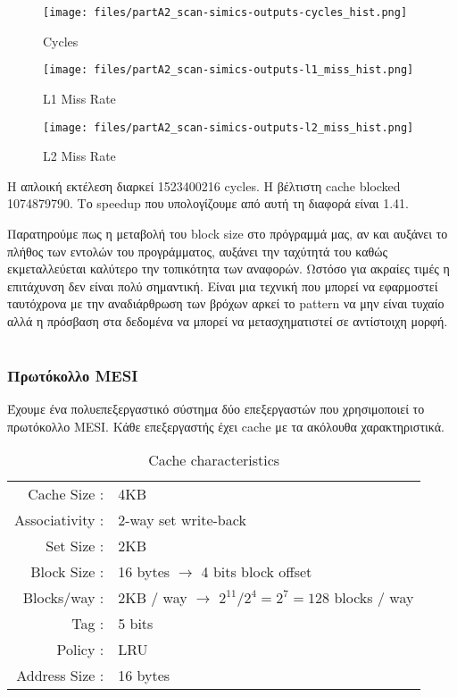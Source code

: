 \documentclass[a4paper,12pt]{article}
\begin{document}
\begin{figure}[H]
	\centering
    \texttt{[image: files/partA2\_scan-simics-outputs-cycles\_hist.png]}
	\caption{Cycles}
	\label{fig:B1}
\end{figure}

\begin{figure}[H]
	\centering
    \texttt{[image: files/partA2\_scan-simics-outputs-l1\_miss\_hist.png]}
    \caption{L1 Miss Rate}
	\label{fig:B2}
\end{figure}

\begin{figure}[H]
	\centering
    \texttt{[image: files/partA2\_scan-simics-outputs-l2\_miss\_hist.png]}
    \caption{L2 Miss Rate}
	\label{fig:B3}
\end{figure}


Η απλοική εκτέλεση διαρκεί 1523400216 cycles. H βέλτιστη cache blocked
1074879790. Το speedup που υπολογίζουμε από αυτή τη διαφορά είναι 1.41.


Παρατηρούμε πως η μεταβολή του block size στο πρόγραμμά μας, αν και αυξάνει το πλήθος των
εντολών του προγράμματος, αυξάνει την ταχύτητά του καθώς εκμεταλλεύεται
καλύτερο την τοπικότητα των αναφορών. Ωστόσο για ακραίες τιμές η επιτάχυνση
δεν είναι πολύ σημαντική. Είναι μια τεχνική που μπορεί να εφαρμοστεί
ταυτόχρονα με την αναδιάρθρωση των βρόχων αρκεί το pattern να μην είναι τυχαίο
αλλά η πρόσβαση στα δεδομένα να μπορεί να μετασχηματιστεί σε αντίστοιχη μορφή.


\setcounter{section}{0}
\part{}
\section{Πρωτόκολλο MESI}

Έχουμε ένα πολυεπεξεργαστικό σύστημα δύο επεξεργαστών που χρησιμοποιεί το
πρωτόκολλο MESI. Κάθε επεξεργαστής έχει cache με τα ακόλουθα χαρακτηριστικά.

\begin{table}[H]
    \centering
    \begin{tabular}{r l}
        Cache Size : & 4KB \\
        Associativity : & 2-way set write-back \\
        Set Size : & 2KB \\
        Block Size : & 16 bytes $\rightarrow$ 4 bits block offset\\
        Blocks/way : & 2KB / way $\rightarrow$ $2^{11}/2^4=2^7=128$ blocks / way \\
        Tag : & 5 bits \\
        Policy : & LRU \\
        Address Size : & 16 bytes \\
    \end{tabular}
    \caption{Cache characteristics}
    \label{fig:T5}
\end{table}
\end{document}
